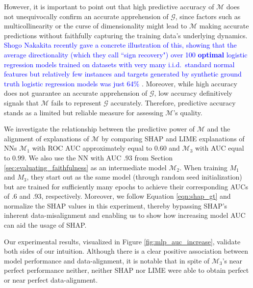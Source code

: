\documentclass[mnsc,blindrev]{informs3}
\newcommand{\mM}{\mathcal{M}}
\begin{document}
           However, it is important to point out that high predictive accuracy of $\mathcal{M}$ does not unequivocally confirm an accurate apprehension of $\mathcal{G}$, since factors such as multicollinearity or the curse of dimensionality might lead to $\mathcal{M}$ making accurate predictions without faithfully capturing the training data's underlying dynamics. \textcolor{blue}{Shogo Nakakita recently gave a concrete illustration of this, showing that the average directionality (which they call ``sign recovery") over 100 \textbf{optimal} logistic regression models trained on datasets with very many i.i.d.~standard normal features but relatively few instances and targets generated by synthetic ground truth logistic regression models was just 64\% \cite{NakakitaShogo2024Ducb}}. %
           Moreover, while high accuracy does not guarantee an accurate apprehension of $\mathcal{G}$, low accuracy definitively signals that $\mathcal{M}$ fails to represent $\mathcal{G}$ accurately. Therefore, predictive accuracy stands as a limited but reliable measure for assessing $\mathcal{M}$'s quality.
 
            
            We investigate the relationship between the predictive power of $\mathcal{M}$ and the alignment of explanations of $\mM$ by comparing SHAP and LIME explanations of NNs $\mathcal{M}_1$  with ROC AUC approximately equal to $0.60$ and $\mathcal{M}_3$ with AUC equal to $0.99$. We also use the NN with AUC $.93$ from Section \ref{sec:evaluating_faithfulness} as an intermediate model $\mathcal{M}_2$. When training $M_1$ and $M_3$, they start out as the same model (through random seed initialization) but are trained for sufficiently many epochs to achieve their corresponding AUCs of .6 and .93, respectively. Moreover, we follow Equation \ref{eqn:shap_gt} and normalize the SHAP values in this experiment, thereby bypassing SHAP's inherent data-misalignment and enabling us to show how increasing model AUC can aid the usage of SHAP. 
            
            Our experimental results, visualized in Figure \ref{fig:mlp_auc_increase}, validate both sides of our intuition. Although there is a clear positive association between model performance and data-alignment, it is notable that in spite of $\mathcal{M}_3$'s near perfect performance neither, neither SHAP nor LIME were able to obtain perfect or near perfect data-alignment. %
     
\end{document}
